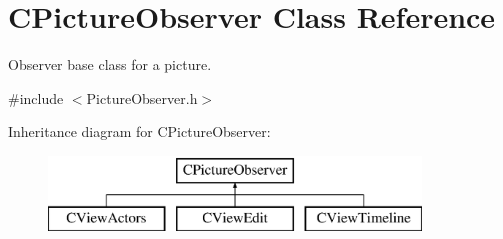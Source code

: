 \hypertarget{class_c_picture_observer}{\section{C\+Picture\+Observer Class Reference}
\label{class_c_picture_observer}
}


Observer base class for a picture.  




{\ttfamily \#include $<$Picture\+Observer.\+h$>$}

Inheritance diagram for C\+Picture\+Observer\+:\begin{figure}[H]
\begin{center}
\leavevmode
\includegraphics[height=2.000000cm]{class_c_picture_observer}
\end{center}
\end{figure}
